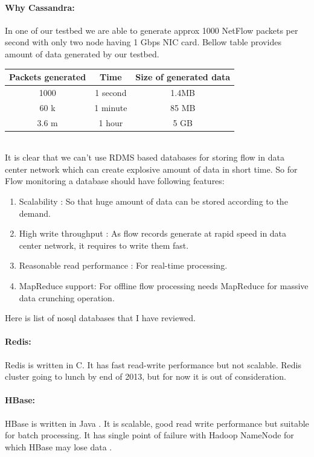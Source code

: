       \paragraph{Why Cassandra:} In one of our testbed we are able to generate approx 1000 NetFlow packets per second with only two node
      having 1 Gbps NIC card. Bellow table provides amount of data generated by our testbed.\\
      \begin{tabular}{ccc}
      \\
      \hline
	  Packets generated& Time & Size of generated data \\
	  \hline
	  1000   & 1 second & 1.4MB\\
	  60 k   & 1 minute & 85 MB\\
	  3.6 m  & 1 hour    &  5 GB\\
      \end{tabular}\\
      It is clear that we can't use RDMS based databases for storing flow in data center network which can create explosive amount of
      data in short time. So for Flow monitoring a database should have following features:
      \begin{enumerate}
       \item Scalability : So that huge amount of data can be stored according to the demand.
       \item High write throughput : As flow records generate at rapid speed in data center network, it requires  to write
	     them fast.
       \item Reasonable read performance : For real-time processing.
       \item MapReduce support: For offline flow processing needs MapReduce for massive data crunching operation.
      \end{enumerate}
      
      Here is list of nosql databases that I have reviewed.
      
      \paragraph{Redis:} Redis is written in C. It has fast read-write performance but not scalable. Redis cluster
      going to lunch by end of 2013\cite{rrdcluster}, but for now it is out of consideration. 
      \paragraph{HBase:} HBase is written in Java . It is scalable, good read write performance but suitable for
      batch processing. It has single point of failure with Hadoop NameNode for which HBase may lose data  .  
